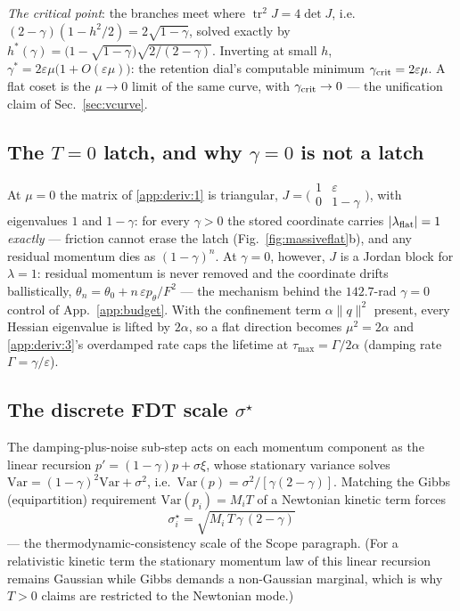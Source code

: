 \documentclass{article}
\begin{document}
\emph{The critical point}: the branches meet where $\operatorname{tr}^2J=4\det J$, i.e.\ $(2-\gamma)(1-h^2/2)=2\sqrt{1-\gamma}$, solved exactly by $h^\ast(\gamma)=\bigl(1-\sqrt{1-\gamma}\bigr)\sqrt{2/(2-\gamma)}$. Inverting at small $h$, $\gamma^\ast=2\varepsilon\mu\bigl(1+O(\varepsilon\mu)\bigr)$: the retention dial's computable minimum $\gamma_{\rm crit}=2\varepsilon\mu$. A flat coset is the $\mu\to0$ limit of the same curve, with $\gamma_{\rm crit}\to0$ --- the unification claim of Sec.~\ref{sec:vcurve}.

\subsection{The $T=0$ latch, and why $\gamma=0$ is not a latch}\label{app:deriv:4} At $\mu=0$ the matrix of \ref{app:deriv:1} is triangular, $J=\bigl(\begin{smallmatrix}1&\varepsilon\\0&1-\gamma\end{smallmatrix}\bigr)$, with eigenvalues $1$ and $1-\gamma$: for every $\gamma>0$ the stored coordinate carries $|\lambda_{\rm flat}|=1$ \emph{exactly} --- friction cannot erase the latch (Fig.~\ref{fig:massiveflat}b), and any residual momentum dies as $(1-\gamma)^n$. At $\gamma=0$, however, $J$ is a Jordan block for $\lambda=1$: residual momentum is never removed and the coordinate drifts ballistically, $\theta_n=\theta_0+n\,\varepsilon p_\theta/F^2$ --- the mechanism behind the $142.7$-rad $\gamma=0$ control of App.~\ref{app:budget}. With the confinement term $\alpha\|q\|^2$ present, every Hessian eigenvalue is lifted by $2\alpha$, so a flat direction becomes $\mu^2=2\alpha$ and \ref{app:deriv:3}'s overdamped rate caps the lifetime at $\tau_{\max}=\Gamma/2\alpha$ (damping rate $\Gamma=\gamma/\varepsilon$).

\subsection{The discrete FDT scale $\sigma^\star$}\label{app:deriv:5} The damping-plus-noise sub-step acts on each momentum component as the linear recursion $p'=(1-\gamma)p+\sigma\xi$, whose stationary variance solves $\mathrm{Var}=(1-\gamma)^2\mathrm{Var}+\sigma^2$, i.e.\ $\mathrm{Var}(p)=\sigma^2/[\gamma(2-\gamma)]$. Matching the Gibbs (equipartition) requirement $\mathrm{Var}(p_i)=M_iT$ of a Newtonian kinetic term forces
\[
\sigma^\star_i=\sqrt{M_i\,T\,\gamma\,(2-\gamma)}
\]
--- the thermodynamic-consistency scale of the Scope paragraph. (For a relativistic kinetic term the stationary momentum law of this linear recursion remains Gaussian while Gibbs demands a non-Gaussian marginal, which is why $T>0$ claims are restricted to the Newtonian mode.)
\end{document}
